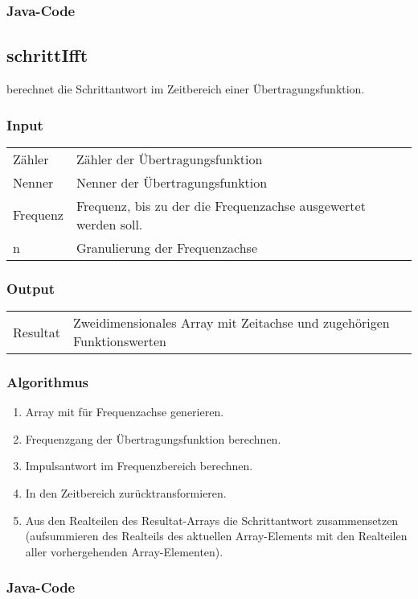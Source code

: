 \subsubsection*{Java-Code}



\subsection{schrittIfft}

   berechnet  die   Schrittantwort   im  Zeitbereich   einer
\"Ubertragungsfunktion. 

\subsubsection*{Input}

\begin{tabular}{p{40mm}l}
    Z\"ahler & Z\"ahler der \"Ubertragungsfunktion                             \\
    Nenner   & Nenner der \"Ubertragungsfunktion                               \\
    Frequenz & Frequenz, bis zu der die Frequenzachse ausgewertet werden soll. \\
    n        & Granulierung der Frequenzachse
\end{tabular}

\subsubsection*{Output}
\begin{tabular}{p{40mm}l}
    Resultat & \parbox[t][4em][s]{0.7\textwidth}{Zweidimensionales Array mit Zeitachse und zugeh\"origen Funktionswerten}
\end{tabular}

\subsubsection*{Algorithmus}
\begin{enumerate}
    \item
        Array mit f\"ur Frequenzachse generieren.
    \item
        Frequenzgang der \"Ubertragungsfunktion berechnen.
    \item
        Impulsantwort im Frequenzbereich berechnen.
    \item
        In den Zeitbereich zur\"ucktransformieren.
    \item
        Aus   den   Realteilen    des   Resultat-Arrays   die   Schrittantwort
        zusammensetzen    (aufsummieren    des   Realteils    des    aktuellen
        Array-Elements    mit    den     Realteilen    aller    vorhergehenden
        Array-Elementen).
\end{enumerate}

\subsubsection*{Java-Code}

